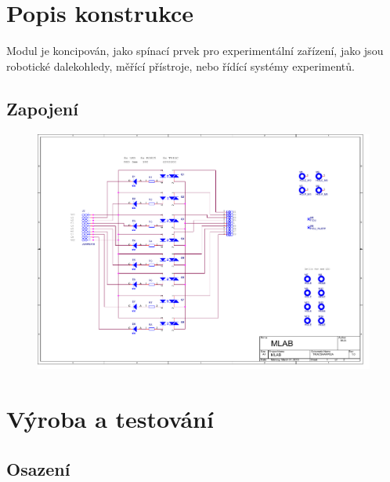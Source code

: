 \documentclass[12pt,a4paper,oneside]{article}
\begin{document}
\newpage
\section{Popis konstrukce}

Modul je koncipován, jako spínací prvek pro experimentální zařízení, jako jsou robotické dalekohledy, měřící přístroje, nebo řídící systémy experimentů. 

\subsection{Zapojení}

\begin{figure} [htbp]
  \includegraphics[trim = 5mm 30mm 120mm 15mm, clip, width=15cm]{../../SCH/TRIACSHARP02A.pdf}
\end{figure}

\section{Výroba a testování}

\subsection{Osazení}
\end{document}
